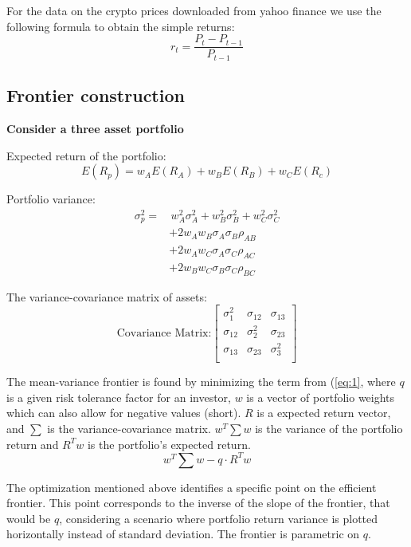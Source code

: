 \documentclass[12pt,a4paper]{article}
\begin{document}
\noindent For the data on the crypto prices downloaded from yahoo finance we use the following formula to obtain the simple 
returns: 
$$r_t = \frac{P_t-P_{t-1}}{P_{t-1}}$$

\subsection{Frontier construction}
\textbf{Consider a three asset portfolio}

Expected return of the portfolio:
$$E(R_p) = w_AE(R_A) + w_BE(R_B) + w_CE(R_c)$$

Portfolio variance: 
\begin{align*} %
\sigma^2_p = & \, w^2_A\sigma^2_A + w^2_B\sigma^2_B + w^2_C\sigma^2_C \\
            & + 2w_A w_B\sigma_A\sigma_B\rho_{AB} \\
            & + 2w_A w_C\sigma_A\sigma_C\rho_{AC} \\
            & + 2w_B w_C\sigma_B\sigma_C\rho_{BC}
\end{align*}


The variance-covariance matrix of assets: 
\[
\text{Covariance Matrix:}
\begin{bmatrix}
    \sigma_{1}^2 & \sigma_{12} & \sigma_{13} \\
    \sigma_{12} & \sigma_{2}^2 & \sigma_{23} \\
    \sigma_{13} & \sigma_{23} & \sigma_{3}^2 \\
\end{bmatrix}
\]

\noindent The mean-variance frontier is found by minimizing the term from (\ref{eq:1}, where $q$ is a given risk tolerance 
factor for an investor, $w$ is a vector of portfolio weights which can also allow for negative values (short). $R$ is a 
expected return vector, and $\sum$ is the variance-covariance matrix. $w^T\sum w$ is the variance of the portfolio return 
and $R^Tw$ is the portfolio's expected return.\cite{wikiref}
\begin{equation}\label{eq:1}
 w^T\sum w - q \cdot R^Tw    
\end{equation}

\noindent The optimization mentioned above identifies a specific point on the efficient frontier. This point corresponds to 
the inverse of the slope of the frontier, that would be $q$, considering a scenario where portfolio return variance is 
plotted horizontally instead of standard deviation. The frontier is parametric on $q$.\cite{wikiref}
\end{document}
